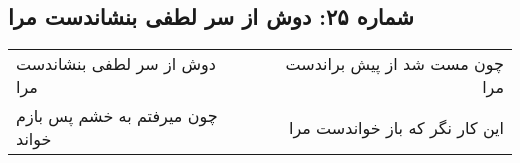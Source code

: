 \begin{center}
\section*{شماره ۲۵: دوش از سر لطفی بنشاندست مرا}
\label{sec:025}
\begin{longtable}{l p{0.5cm} r}
دوش از سر لطفی بنشاندست مرا
&&
چون مست شد از پیش براندست مرا
\\
چون میرفتم به خشم پس بازم خواند
&&
این کار نگر که باز خواندست مرا
\\
\end{longtable}
\end{center}
